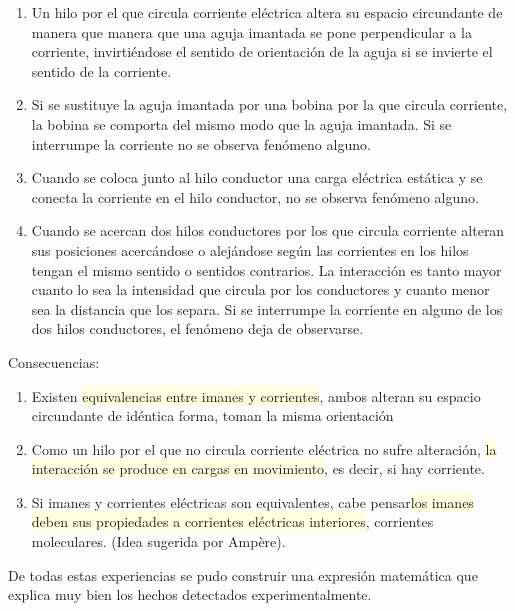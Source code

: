 \begin{enumerate}
\item Un hilo por el que circula corriente eléctrica altera su espacio circundante de manera que manera que una aguja imantada se pone perpendicular a la corriente, invirtiéndose el sentido de orientación de la aguja si se invierte el sentido de la corriente.
\item Si se sustituye la aguja imantada por una bobina por la que circula corriente, la bobina se comporta del mismo modo que la aguja imantada. Si se interrumpe la corriente no se observa fenómeno alguno.
\item Cuando se coloca junto al hilo conductor una carga eléctrica estática y se conecta la corriente en el hilo conductor, no se observa fenómeno alguno.
\item Cuando se acercan dos hilos conductores por los que circula corriente alteran sus posiciones acercándose o alejándose según las corrientes en los hilos tengan el mismo sentido o sentidos contrarios. La interacción es tanto mayor cuanto lo sea la intensidad que circula por los conductores y cuanto menor sea la distancia que los separa. Si se interrumpe la corriente en alguno de los dos hilos conductores, el fenómeno deja de observarse.
\end{enumerate}

Consecuencias:

\begin{enumerate}
\item Existen \colorbox{LightYellow}{equivalencias entre imanes y corrientes}, ambos alteran su espacio circundante de idéntica forma, toman la misma orientación
\item Como un hilo por el que no circula corriente eléctrica no sufre alteración, \colorbox{LightYellow}{la interacción se produce en cargas en movimiento}, es decir, si hay corriente.
\item Si imanes y corrientes eléctricas son equivalentes, cabe pensar\colorbox{LightYellow}{los imanes} \colorbox{LightYellow} {deben sus propiedades a corrientes eléctricas interiores}, corrientes moleculares. (Idea sugerida por Ampère).
\end{enumerate}

De todas estas experiencias se pudo construir una expresión matemática que explica muy bien los hechos detectados experimentalmente.

